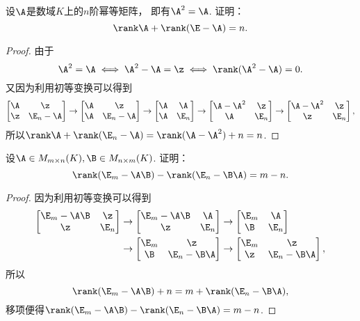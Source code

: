 \begin{example}\label{example:幂等矩阵.幂等矩阵的秩的性质1}
设\(\A\)是数域\(K\)上的\(n\)阶幂等矩阵，
即有\(\A^2=\A\).
证明：\[
	\rank\A+\rank(\E-\A)=n.
\]
\begin{proof}
由于\[
	\A^2=\A
	\iff
	\A^2-\A=\z
	\iff
	\rank(\A^2-\A)=0.
\]
又因为利用初等变换可以得到\[
	\begin{bmatrix}
		\A & \z \\
		\z & \E_n-\A
	\end{bmatrix}
	\to \begin{bmatrix}
		\A & \z \\
		\A & \E_n-\A
	\end{bmatrix}
	\to \begin{bmatrix}
		\A & \A \\
		\A & \E_n
	\end{bmatrix}
	\to \begin{bmatrix}
		\A-\A^2 & \z \\
		\A & \E_n
	\end{bmatrix}
	\to \begin{bmatrix}
		\A-\A^2 & \z \\
		\z & \E_n
	\end{bmatrix},
\]
所以\(\rank\A+\rank(\E_n-\A)
=\rank(\A-\A^2)+n
=n\).
\end{proof}
\end{example}

\begin{example}\label{example:单位矩阵与两矩阵乘积之差.单位矩阵与两矩阵乘积之差的秩}
设\(\A \in M_{m \times n}(K),
\B \in M_{n \times m}(K)\).
证明：\[
	\rank(\E_m-\A\B)-\rank(\E_n-\B\A)=m-n.
\]
\begin{proof}
因为利用初等变换可以得到\begin{align*}
	\begin{bmatrix}
		\E_m-\A\B & \z \\
		\z & \E_n
	\end{bmatrix}
	&\to \begin{bmatrix}
		\E_m-\A\B & \A \\
		\z & \E_n
	\end{bmatrix}
	\to \begin{bmatrix}
		\E_m & \A \\
		\B & \E_n
	\end{bmatrix} \\
	&\to \begin{bmatrix}
		\E_m & \z \\
		\B & \E_n-\B\A
	\end{bmatrix}
	\to \begin{bmatrix}
		\E_m & \z \\
		\z & \E_n-\B\A
	\end{bmatrix},
\end{align*}
所以\[
	\rank(\E_m-\A\B)+n=m+\rank(\E_n-\B\A),
\]
移项便得\(\rank(\E_m-\A\B)-\rank(\E_n-\B\A)=m-n\).
\end{proof}
\end{example}

